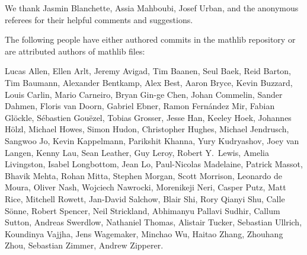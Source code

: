 \documentclass[sigplan]{acmart}\settopmatter{}
\newcommand{\mathlib}{\textsf{mathlib}\xspace}
\begin{document}
\begin{acks}                            %

We thank Jasmin Blanchette, Assia Mahboubi, Josef Urban, and the anonymous referees for their helpful comments and suggestions.  
  
The following people have either authored commits in the \mathlib repository or are attributed authors of \mathlib files:

Lucas Allen, Ellen Arlt, Jeremy Avigad, Tim Baanen, Seul Baek, Reid Barton, Tim Baumann, Alexander Bentkamp, Alex Best, Aaron Bryce, Kevin Buzzard, Louis Carlin, Mario Carneiro, Bryan Gin-ge Chen, Johan Commelin, Sander Dahmen, Floris van Doorn, Gabriel Ebner, Ramon Fern\'andez Mir, Fabian Gl\"ockle, S\'ebastien Gou\"ezel, Tobias Grosser, Jesse Han, Keeley Hoek, Johannes H\"olzl, Michael Howes, Simon Hudon, Christopher Hughes, Michael Jendrusch, Sangwoo Jo, Kevin Kap\-pel\-mann, Parikshit Khanna, Yury Kudryashov, Joey van Langen, Kenny Lau, Sean Leather, Guy Leroy, Robert Y.\ Lewis, Amelia Livingston, Isabel Longbottom, Jean Lo, Paul-\-Nico\-las Madelaine, Patrick Massot, Bhavik Mehta, Rohan Mitta, Stephen Morgan, Scott Morrison, Leonardo de Moura, Oliver Nash, Wojciech Nawrocki, Moreni\-keji Neri, Casper Putz, Matt Rice, Mitchell Rowett, Jan-David Salchow, Blair Shi, Rory Qianyi Shu, Calle S\"onne, Robert Spencer, Neil Strickland, Abhimanyu Pallavi Sudhir, Callum Sutton, Andreas Swerdlow, Nathaniel Thomas, Alistair Tucker, Sebastian Ullrich, Koun\-din\-ya Vajjha, Jens Wagemaker, Minchao Wu, Hai\-tao Zhang, Zhou\-hang Zhou, Sebastian Zimmer, Andrew Zipperer.


\end{acks}



\end{document}
